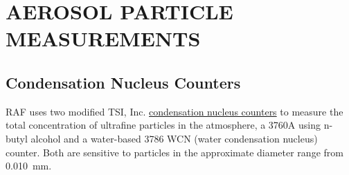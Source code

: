 
\section{AEROSOL PARTICLE MEASUREMENTS\label{sec:AEROSOL-PARTICLE-MEASUREMENTS}}

\subsection{Condensation Nucleus Counters}

RAF uses two modified TSI, Inc. \href{http://www.eol.ucar.edu/instruments/condensation-nucleus-counter-water-or-butanol}{condensation nucleus counters}
to measure the total concentration of ultrafine particles
in the atmosphere, a 3760A using n-butyl
alcohol and a water-based 3786 WCN (water
condensation nucleus) counter. Both are sensitive to particles in
the approximate diameter range from 0.010~\textgreek{m}m.
\\

